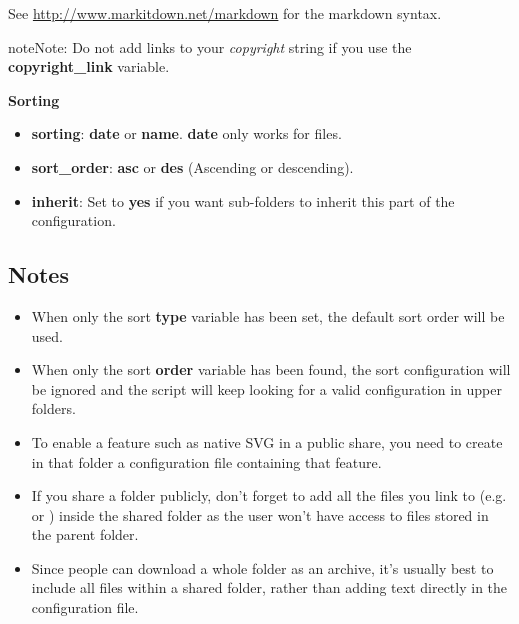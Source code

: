 \documentclass[letterpaper,10pt,english]{sphinxmanual}
\begin{document}
See \href{http://www.markitdown.net/markdown}{http://www.markitdown.net/markdown} for the markdown syntax.

\begin{notice}{note}{Note:}
Do not add links to your \emph{copyright} string if you use the
\textbf{copyright\_link} variable.
\end{notice}

\textbf{Sorting}
\begin{itemize}
\item {} 
\textbf{sorting}: \textbf{date} or \textbf{name}. \textbf{date} only works for files.

\item {} 
\textbf{sort\_order}: \textbf{asc} or \textbf{des} (Ascending or descending).

\item {} 
\textbf{inherit}: Set to \textbf{yes} if you want sub-folders to inherit this part of
the configuration.

\end{itemize}


\subsection{Notes}
\label{files/gallery_app:notes}\begin{itemize}
\item {} 
When only the sort \textbf{type} variable has been set, the default sort order
will be used.

\item {} 
When only the sort \textbf{order} variable has been found, the sort configuration
will be ignored and the script will keep looking for a valid configuration in
upper folders.

\item {} 
To enable a feature such as native SVG in a public share, you need to create
in that folder a configuration file containing that feature.

\item {} 
If you share a folder publicly, don't forget to add all the files you link to
(e.g.  or ) inside the shared folder as
the user won't have access to files stored in the parent folder.

\item {} 
Since people can download a whole folder as an archive, it's usually best to
include all files within a shared folder, rather than adding text directly
in the configuration file.

\end{itemize}
\end{document}
